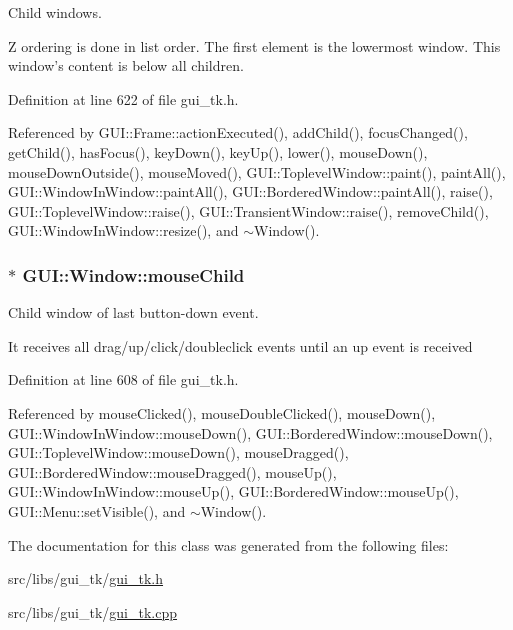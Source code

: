 Child windows. 

Z ordering is done in list order. The first element is the lowermost window. This window's content is below all children. 

Definition at line 622 of file gui\-\_\-tk.\-h.



Referenced by G\-U\-I\-::\-Frame\-::action\-Executed(), add\-Child(), focus\-Changed(), get\-Child(), has\-Focus(), key\-Down(), key\-Up(), lower(), mouse\-Down(), mouse\-Down\-Outside(), mouse\-Moved(), G\-U\-I\-::\-Toplevel\-Window\-::paint(), paint\-All(), G\-U\-I\-::\-Window\-In\-Window\-::paint\-All(), G\-U\-I\-::\-Bordered\-Window\-::paint\-All(), raise(), G\-U\-I\-::\-Toplevel\-Window\-::raise(), G\-U\-I\-::\-Transient\-Window\-::raise(), remove\-Child(), G\-U\-I\-::\-Window\-In\-Window\-::resize(), and $\sim$\-Window().

\hypertarget{classGUI_1_1Window_addd401dab430594e678366e7ff73ef2d}{
\subsubsection[{mouse\-Child}]{$\ast$ {\bf G\-U\-I\-::\-Window\-::mouse\-Child}}}\label{classGUI_1_1Window_addd401dab430594e678366e7ff73ef2d}


Child window of last button-\/down event. 

It receives all drag/up/click/doubleclick events until an up event is received 

Definition at line 608 of file gui\-\_\-tk.\-h.



Referenced by mouse\-Clicked(), mouse\-Double\-Clicked(), mouse\-Down(), G\-U\-I\-::\-Window\-In\-Window\-::mouse\-Down(), G\-U\-I\-::\-Bordered\-Window\-::mouse\-Down(), G\-U\-I\-::\-Toplevel\-Window\-::mouse\-Down(), mouse\-Dragged(), G\-U\-I\-::\-Bordered\-Window\-::mouse\-Dragged(), mouse\-Up(), G\-U\-I\-::\-Window\-In\-Window\-::mouse\-Up(), G\-U\-I\-::\-Bordered\-Window\-::mouse\-Up(), G\-U\-I\-::\-Menu\-::set\-Visible(), and $\sim$\-Window().



The documentation for this class was generated from the following files\-:\begin{DoxyCompactItemize}
\item 
src/libs/gui\-\_\-tk/\hyperlink{gui__tk_8h}{gui\-\_\-tk.\-h}\item 
src/libs/gui\-\_\-tk/\hyperlink{gui__tk_8cpp}{gui\-\_\-tk.\-cpp}\end{DoxyCompactItemize}
